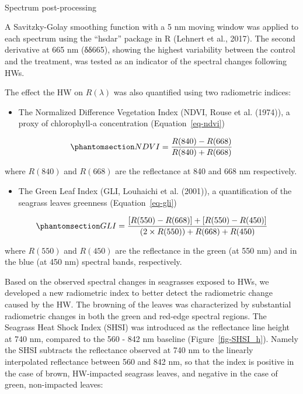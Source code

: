 \documentclass[
  letterpaper,
  11pt,
  english,
  singlespacing,
  headsepline]{MastersDoctoralThesis}
\makeatletter
\let\oldparagraph\paragraph
\renewcommand{\paragraph}{
    \@ifstar
      \xxxParagraphStar
      \xxxParagraphNoStar
  }
\newcommand{\xxxParagraphStar}[1]{\oldparagraph*{#1}\mbox{}}
\newcommand{\xxxParagraphNoStar}[1]{\oldparagraph{#1}\mbox{}}
\providecommand{\tightlist}{%
  \setlength{\itemsep}{0pt}\setlength{\parskip}{0pt}}\usepackage{longtable,booktabs,array}
\makeatother
\begin{document}
\begin{spacing}{1.5}
\paragraph{Spectrum post-processing}\label{spectrum-post-processing}

A Savitzky-Golay smoothing function with a 5 nm moving window was
applied to each spectrum using the ``hsdar'' package in R (Lehnert et
al., 2017). The second derivative at 665 nm (δδ665), showing the highest
variability between the control and the treatment, was tested as an
indicator of the spectral changes following HWs.

The effect the HW on \(R(\lambda)\) was also quantified using two
radiometric indices:

\begin{itemize}
\tightlist
\item
  The Normalized Difference Vegetation Index (NDVI, Rouse et al.
  (1974)), a proxy of chlorophyll-a concentration
  (Equation~\ref{eq-ndvi})
\end{itemize}

\begin{equation}\phantomsection\label{eq-ndvi}{
NDVI = \frac{R(840)-R(668)}{R(840)+R(668)}
}\end{equation}

where \(R(840)\) and \(R(668)\) are the reflectance at 840 and 668 nm
respectively.

\begin{itemize}
\tightlist
\item
  The Green Leaf Index (GLI, Louhaichi et al. (2001)), a quantification
  of the seagrass leaves greenness (Equation~\ref{eq-gli})
\end{itemize}

\begin{equation}\phantomsection\label{eq-gli}{
GLI = \frac{[R(550)-R(668)]+[R(550)-R(450)]}{(2 \times R(550) )+ R(668) + R(450) }
}\end{equation}

where \(R(550)\) and \(R(450)\) are the reflectance in the green (at 550
nm) and in the blue (at 450 nm) spectral bands, respectively.

Based on the observed spectral changes in seagrasses exposed to HWs, we
developed a new radiometric index to better detect the radiometric
change caused by the HW. The browning of the leaves was characterized by
substantial radiometric changes in both the green and red-edge spectral
regions. The Seagrass Heat Shock Index (SHSI) was introduced as the
reflectance line height at 740 nm, compared to the 560 - 842 nm baseline
(Figure~\ref{fig-SHSI_h}). Namely the SHSI subtracts the reflectance
observed at 740 nm to the linearly interpolated reflectance between 560
and 842 nm, so that the index is positive in the case of brown,
HW-impacted seagrass leaves, and negative in the case of green,
non-impacted leaves:


\end{spacing}
\end{document}
